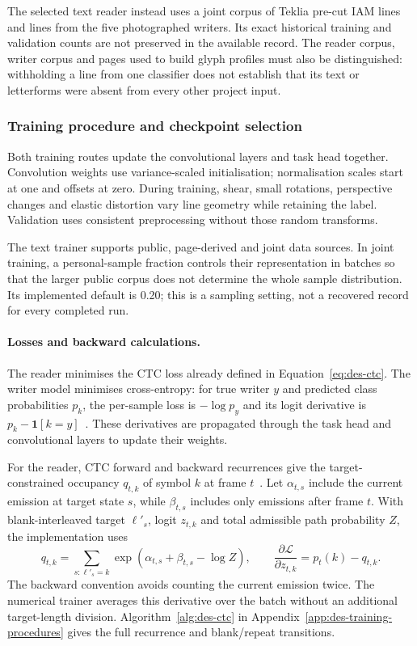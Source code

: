 The selected text reader instead uses a joint corpus of Teklia pre-cut IAM lines and lines from the five photographed writers. Its exact historical training and validation counts are not preserved in the available record. The reader corpus, writer corpus and pages used to build glyph profiles must also be distinguished: withholding a line from one classifier does not establish that its text or letterforms were absent from every other project input.

\subsubsection{Training procedure and checkpoint selection}
\label{sec:des-training}
Both training routes update the convolutional layers and task head together. Convolution weights use variance-scaled initialisation; normalisation scales start at one and offsets at zero. During training, shear, small rotations, perspective changes and elastic distortion vary line geometry while retaining the label. Validation uses consistent preprocessing without those random transforms.

The text trainer supports public, page-derived and joint data sources. In joint training, a personal-sample fraction controls their representation in batches so that the larger public corpus does not determine the whole sample distribution. Its implemented default is 0.20; this is a sampling setting, not a recovered record for every completed run.

\paragraph{Losses and backward calculations.}
The reader minimises the CTC loss already defined in Equation~\ref{eq:des-ctc}. The writer model minimises cross-entropy: for true writer $y$ and predicted class probabilities $p_k$, the per-sample loss is $-\log p_y$ and its logit derivative is $p_k-\mathbf{1}[k=y]$~\cite[p.~6]{graves2013}. These derivatives are propagated through the task head and convolutional layers to update their weights.

For the reader, CTC forward and backward recurrences give the target-constrained occupancy $q_{t,k}$ of symbol $k$ at frame $t$~\cite[pp.~4--6]{graves2006}. Let $\alpha_{t,s}$ include the current emission at target state $s$, while $\beta_{t,s}$ includes only emissions after frame $t$. With blank-interleaved target $\ell'_s$, logit $z_{t,k}$ and total admissible path probability $Z$, the implementation uses
\begin{equation}
q_{t,k}=\sum_{s:\ell'_s=k}\exp(\alpha_{t,s}+\beta_{t,s}-\log Z),
\qquad \frac{\partial\mathcal L}{\partial z_{t,k}}=p_t(k)-q_{t,k}.
\label{eq:des-ctcgrad}
\end{equation}
The backward convention avoids counting the current emission twice. The numerical trainer averages this derivative over the batch without an additional target-length division. Algorithm~\ref{alg:des-ctc} in Appendix~\ref{app:des-training-procedures} gives the full recurrence and blank/repeat transitions.

